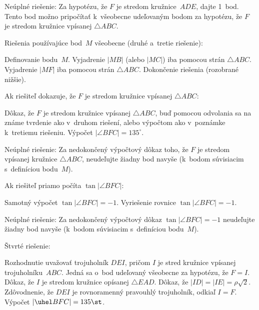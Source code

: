 {Neúplné riešenie: Za hypotézu, že $F$ je stredom
kružnice~$ADE$, dajte 1~bod. Tento bod možno pripočítať k~všeobecne
udeľovaným bodom za hypotézu, že $F$ je stredom kružnice
vpísanej $\triangle ABC$.

\Podnadpis Riešenia používajúce bod~$M$ všeobecne (druhé a~tretie riešenie):

 Definovanie bodu~$M$.
 Vyjadrenie $|MB|$ (alebo $|MC|$) iba pomocou strán $\triangle ABC$.
 Vyjadrenie $|MF|$ iba pomocou strán $\triangle ABC$.
 Dokončenie riešenia (rozobrané nižšie).

\Podnadpis Ak riešiteľ dokazuje, že $F$ je stredom kružnice
vpísanej $\triangle ABC$:

 Dôkaz, že $F$ je stredom kružnice vpísanej
$\triangle ABC$, buď pomocou odvolania sa na známe tvrdenie ako
v~druhom riešení, alebo výpočtom ako v~poznámke k~tretiemu riešeniu.
 Výpočet $|\angle BFC| = 135^\circ$.

Neúplné riešenie: Za nedokončený výpočtový dôkaz toho, že
$F$ je stredom vpísanej kružnice $\triangle ABC$, neudeľujte žiadny bod navyše
(k~bodom súvisiacim s~definíciou bodu~$M$).

\Podnadpis Ak riešiteľ priamo počíta $\tan |\angle BFC|$:

 Samotný výpočet $\tan |\angle BFC| =-1$.
 Vyriešenie rovnice $\tan |\angle BFC| =-1$.

Neúplné riešenie: Za nedokončený výpočtový dôkaz
$\tan |\angle BFC| ={-1}$ neudeľujte žiadny bod navyše (k~bodom súvisiacim
s~definíciou bodu~$M$).

\Podnadpis Štvrté riešenie:

 Rozhodnutie uvažovať trojuholník $DEI$, pričom $I$ je stred kružnice vpísanej
trojuholníku~$ABC$. Jedná sa o~bod udeľovaný všeobecne za hypotézu, že $F=I$.
 Dôkaz, že $I$ je stredom kružnice opísanej $\triangle EAD$.
 Dôkaz, že $|ID|=|IE|=\rho\sqrt2$.
 Zdôvodnenie, že $DEI$ je rovnoramenný pravouhlý trojuholník, odkiaľ $I=F$.
 Výpočet $|\uhel BFC|=135\st$.

\EndSchema

\endpetit
\bigbreak
}


